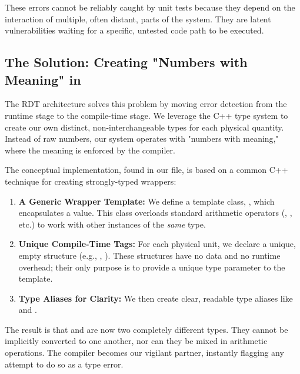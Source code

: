 These errors cannot be reliably caught by unit tests because they depend on the interaction of multiple, often distant, parts of the system. They are latent vulnerabilities waiting for a specific, untested code path to be executed.

\subsection{The Solution: Creating "Numbers with Meaning" in }
\label{subsec:numbers_with_meaning_conceptual}

The RDT architecture solves this problem by moving error detection from the runtime stage to the compile-time stage. We leverage the C++ type system to create our own distinct, non-interchangeable types for each physical quantity. Instead of raw numbers, our system operates with "numbers with meaning," where the meaning is enforced by the compiler.

The conceptual implementation, found in our  file, is based on a common C++ technique for creating strongly-typed wrappers:
\begin{enumerate}
    \item \textbf{A Generic Wrapper Template:} We define a template class, , which encapsulates a  value. This class overloads standard arithmetic operators (\hcode{+}, \hcode{-}, etc.) to work with other instances of the \textit{same}  type.
    
    \item \textbf{Unique Compile-Time Tags:} For each physical unit, we declare a unique, empty structure (e.g., , ). These structures have no data and no runtime overhead; their only purpose is to provide a unique type parameter to the  template.
    
    \item \textbf{Type Aliases for Clarity:} We then create clear, readable type aliases like  and .
\end{enumerate}

The result is that  and  are now two completely different types. They cannot be implicitly converted to one another, nor can they be mixed in arithmetic operations. The compiler becomes our vigilant partner, instantly flagging any attempt to do so as a type error.

